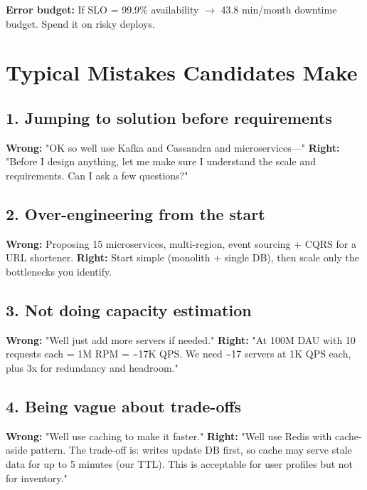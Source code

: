 \documentclass[11pt]{article}
\begin{document}
\textbf{Error budget:} If SLO = 99.9\% availability \(\rightarrow\) 43.8 min/month downtime budget. Spend it on risky deploys.

\section{Typical Mistakes Candidates Make}\label{typical-mistakes-candidates-make}

\subsection{1. Jumping to solution before requirements}\label{1-jumping-to-solution-before-requirements}

\textbf{Wrong:} "OK so we\textquotesingle ll use Kafka and Cassandra and microservices---"
\textbf{Right:} "Before I design anything, let me make sure I understand the scale and requirements. Can I ask a few questions?"

\subsection{2. Over-engineering from the start}\label{2-over-engineering-from-the-start}

\textbf{Wrong:} Proposing 15 microservices, multi-region, event sourcing + CQRS for a URL shortener.
\textbf{Right:} Start simple (monolith + single DB), then scale only the bottlenecks you identify.

\subsection{3. Not doing capacity estimation}\label{3-not-doing-capacity-estimation}

\textbf{Wrong:} "We\textquotesingle ll just add more servers if needed."
\textbf{Right:} "At 100M DAU with 10 requests each = 1M RPM = \textasciitilde17K QPS. We need \textasciitilde17 servers at 1K QPS each, plus 3x for redundancy and headroom."

\subsection{4. Being vague about trade-offs}\label{4-being-vague-about-trade-offs}

\textbf{Wrong:} "We\textquotesingle ll use caching to make it faster."
\textbf{Right:} "We\textquotesingle ll use Redis with cache-aside pattern. The trade-off is: writes update DB first, so cache may serve stale data for up to 5 minutes (our TTL). This is acceptable for user profiles but not for inventory."
\end{document}
